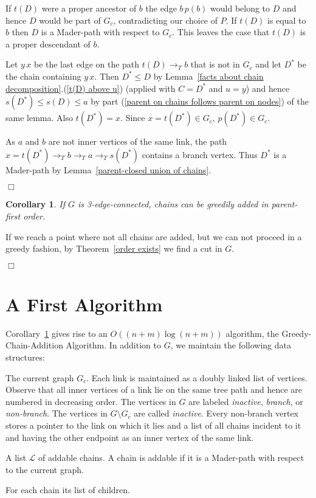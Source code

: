 \documentclass[paper=a4]{scrartcl}
\newtheorem{corollary}{Corollary}
\newcommand{\qed}{}
\newcommand{\mqed}{\hfill$\Box$}
\newlength{\proofpostskipamount}\newlength{\proofpreskipamount}
\newenvironment{proof}{\par\vspace{\proofpreskipamount}\noindent{\textbf{Proof:}}\hspace{0.5em}}{\nopagebreak \strut\nopagebreak \hspace{\fill}\mqed\par\vspace{\proofpostskipamount}\noindent}
\newcommand{\edge}[2]{\ensuremath{#1\,#2}}
\begin{document}
\begin{proof}
If $t(D)$ were a proper ancestor of $b$ the edge $\edge{b}{p(b)}$ would belong to $D$ and hence $D$ would be part of $G_c$, contradicting our choice of $P$. If $t(D)$ is equal to $b$ then $D$ is a Mader-path with respect to $G_c$. This leaves the case that $t(D)$ is a proper descendant of $b$.

Let $\edge yx$ be the last edge on the path $t(D)\rightarrow_T b$ that is not in $G_c$ and let $D^*$ be the chain containing $\edge yx$. Then $D^* \le D$ by Lemma~\ref{facts about chain decomposition}.(\ref{t(D) above u}) (applied with $C = D^*$ and $u = y$) and hence $s(D^*) \le s(D) \le a$ by part (\ref{parent on chains follows parent on nodes}) of the same lemma. Also $t(D^*) = x$. Since $x=t(D^*)\in G_c$, $p(D^*)\in G_c$.

As $a$ and $b$ are not inner vertices of the same link, the path $x=t(D^*) \rightarrow_T b \rightarrow_T a \rightarrow_T s(D^*)$ contains a branch vertex. Thus $D^*$ is a Mader-path by Lemma~\ref{parent-closed union of chains}.
\qed
\end{proof}
\begin{corollary}\label{greedy works}  If $G$ is 3-edge-connected, chains can be greedily added in parent-first order.
\end{corollary}
\begin{proof} If we reach a point where not all chains are added, but we can not proceed in a greedy fashion, by Theorem~\ref{order exists} we find a cut in $G$.
\end{proof}

\section{A First Algorithm}\label{A First Algorithm}

Corollary~\ref{greedy works} gives rise to an $O((n+m) \log (n+m))$ algorithm, the Greedy-Chain-Addition Algorithm. In addition to $G$, we maintain the following data structures:
\newcommand{\cL}{\ensuremath{\mathcal{L}}\xspace}
\begin{compactitem}
\item The current graph $G_c$. Each link is maintained as a doubly linked list of vertices. Observe that all inner vertices of a link lie on the same tree path and hence are numbered in decreasing order. The vertices in $G$ are labeled \emph{inactive}, \emph{branch}, or \emph{non-branch}. The vertices in $G \setminus G_c$ are called \emph{inactive}. Every non-branch vertex stores a pointer to the link on which it lies and a list of all chains incident to it and having the other endpoint as an inner vertex of the same link. \item A list \cL of addable chains. A chain is addable if it is a Mader-path with respect to the current graph.
\item For each chain its list of children.
\end{compactitem}
\end{document}
